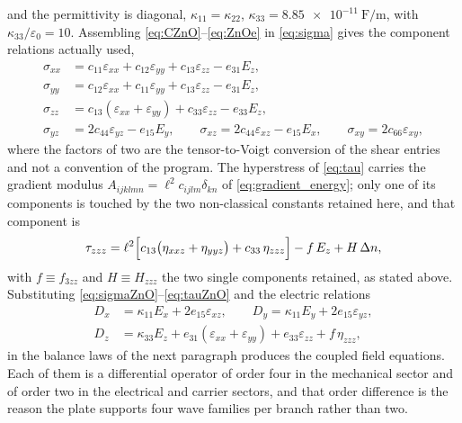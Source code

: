 and the permittivity is diagonal, $\kappa_{11}=\kappa_{22}$,
$\kappa_{33}=\SI{8.85e-11}{\farad\per\metre}$, with
$\kappa_{33}/\varepsilon_0=10$.  Assembling \eqref{eq:CZnO}--\eqref{eq:ZnOe} in
\eqref{eq:sigma} gives the component relations actually used,
\begin{equation}
\label{eq:sigmaZnO}
\begin{aligned}
\sigma_{xx}&=c_{11}\varepsilon_{xx}+c_{12}\varepsilon_{yy}
+c_{13}\varepsilon_{zz}-e_{31}E_z,\\
\sigma_{yy}&=c_{12}\varepsilon_{xx}+c_{11}\varepsilon_{yy}
+c_{13}\varepsilon_{zz}-e_{31}E_z,\\
\sigma_{zz}&=c_{13}(\varepsilon_{xx}+\varepsilon_{yy})
+c_{33}\varepsilon_{zz}-e_{33}E_z,\\
\sigma_{yz}&=2c_{44}\varepsilon_{yz}-e_{15}E_y,\qquad
\sigma_{xz}=2c_{44}\varepsilon_{xz}-e_{15}E_x,\qquad
\sigma_{xy}=2c_{66}\varepsilon_{xy},
\end{aligned}
\end{equation}
where the factors of two are the tensor-to-Voigt conversion of the shear
entries and not a convention of the program.  The hyperstress of
\eqref{eq:tau} carries the gradient modulus $A_{ijklmn}=\ell^2c_{ijlm}\delta_{kn}$
of \eqref{eq:gradient_energy}; only one of its components is touched by the two
non-classical constants retained here, and that component is
\begin{equation}
\label{eq:tauZnO}
\tau_{zzz}=\ell^{2}\Bigl[c_{13}\bigl(\eta_{xxz}+\eta_{yyz}\bigr)
+c_{33}\,\eta_{zzz}\Bigr]-f\,E_z+H\,\Delta n ,
\end{equation}
with $f\equiv f_{3zz}$ and $H\equiv H_{zzz}$ the two single components retained,
as stated above.  Substituting \eqref{eq:sigmaZnO}--\eqref{eq:tauZnO} and the
electric relations
\begin{equation}
\label{eq:DZnO}
\begin{aligned}
D_x&=\kappa_{11}E_x+2e_{15}\varepsilon_{xz},\qquad
D_y=\kappa_{11}E_y+2e_{15}\varepsilon_{yz},\\
D_z&=\kappa_{33}E_z+e_{31}(\varepsilon_{xx}+\varepsilon_{yy})
+e_{33}\varepsilon_{zz}+f\,\eta_{zzz},
\end{aligned}
\end{equation}
in the balance laws of the next paragraph produces the coupled field equations.
Each of them is a differential operator of order four in the mechanical sector
and of order two in the electrical and carrier sectors, and that order
difference is the reason the plate supports four wave families per branch
rather than two.


